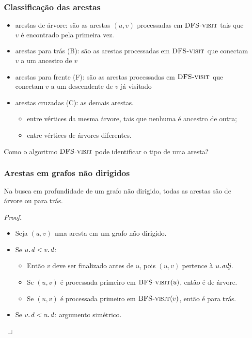 \documentclass{beamer}
\begin{document}
\begin{frame}
\frametitle{Classificação das arestas}

\begin{itemize}
\item arestas de árvore: são as arestas $(u, v)$ processadas em $\textnormal{\scshape DFS-visit}$ tais que $v$ é encontrado pela primeira vez. 
\item arestas para trás (B): são as arestas processadas em $\textnormal{\scshape DFS-visit}$ que conectam $v$ a um ancestro de $v$
\item arestas para frente (F): são as arestas processadas em $\textnormal{\scshape DFS-visit}$ que conectam $v$ a um descendente de $v$ já visitado  
\item arestas cruzadas (C): as demais arestas.  
\begin{itemize}
\item entre vértices da mesma árvore, tais que nenhuma é ancestro de outra;
\item entre vértices de árvores diferentes.
\end{itemize}
\end{itemize}
\pause
\alert{Como o algoritmo $\textnormal{\scshape DFS-visit}$ pode identificar o tipo de uma aresta?}
\end{frame}

\begin{frame}
\frametitle{Arestas em grafos não dirigidos}

\begin{theorem}
Na busca em profundidade de um grafo não dirigido, todas as arestas são de árvore ou para trás.
\end{theorem}

\begin{proof}
\begin{itemize}
\item Seja $(u, v)$ uma aresta em um grafo não dirigido.
\item Se $\attrib{u}{d} < \attrib{v}{d}$:
\begin{itemize}
\item Então $v$ deve ser finalizado antes de $u$, pois $(u, v)$ pertence à $\attrib{u}{adj}$. 
\item Se $(u, v)$ é processada primeiro em $\textnormal{\scshape BFS-visit}(u)$, então é de árvore.
\item Se $(u, v)$ é processada primeiro em $\textnormal{\scshape BFS-visit}(v)$, então é para trás.
\end{itemize}
\item Se $\attrib{v}{d} < \attrib{u}{d}$: argumento simétrico.
\end{itemize}
\end{proof}

\end{frame}
\end{document}
